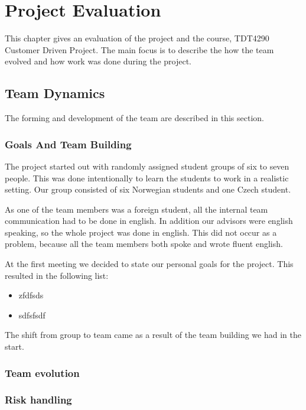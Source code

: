 \chapter{Project Evaluation}
This chapter gives an evaluation of the project and the course, TDT4290 Customer Driven Project. The main focus is to describe the how the team evolved and how work was done during the project.   

\section{Team Dynamics}
The forming and development of the team are described in this section.
\subsection{Goals And Team Building}
The project started out with randomly assigned student groups of six to seven people. This was done intentionally to learn the students to work in a realistic setting. Our group consisted of six Norwegian students and one Czech student. 

As one of the team members was a foreign student, all the internal team communication had to be done in english. In addition our advisors were english speaking, so the whole project was done in english. This did not occur as a problem, because all the team members both spoke and wrote fluent english.

At the first meeting we decided to state our personal goals for the project. This resulted in the following list:
\begin{itemize}
\item zfdfsds
\item sdfsfsdf
\end{itemize}


The shift from group to team came as a result of the team building we had in the start. 


\subsection{Team evolution}


\subsection{Risk handling}



